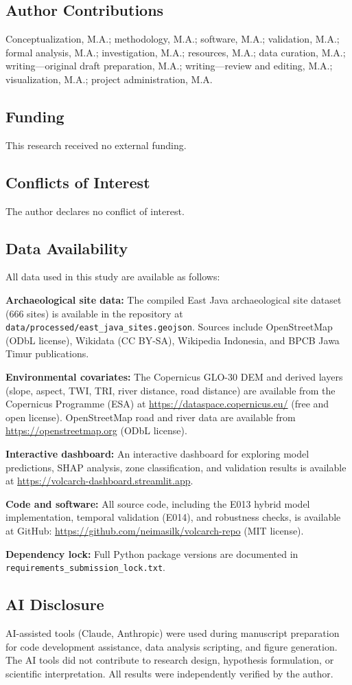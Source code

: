 \documentclass{article}
\begin{document}
\subsection*{Author Contributions}
Conceptualization, M.A.; methodology, M.A.; software, M.A.; validation, M.A.; formal analysis, M.A.; investigation, M.A.; resources, M.A.; data curation, M.A.; writing---original draft preparation, M.A.; writing---review and editing, M.A.; visualization, M.A.; project administration, M.A.

\subsection*{Funding}
This research received no external funding.

\subsection*{Conflicts of Interest}
The author declares no conflict of interest.

\subsection*{Data Availability}
All data used in this study are available as follows:

\textbf{Archaeological site data:} The compiled East Java archaeological site dataset (666 sites) is available in the repository at \texttt{data/processed/east\_java\_sites.geojson}. Sources include OpenStreetMap (ODbL license), Wikidata (CC BY-SA), Wikipedia Indonesia, and BPCB Jawa Timur publications.

\textbf{Environmental covariates:} The Copernicus GLO-30 DEM and derived layers (slope, aspect, TWI, TRI, river distance, road distance) are available from the Copernicus Programme (ESA) at \url{https://dataspace.copernicus.eu/} (free and open license). OpenStreetMap road and river data are available from \url{https://openstreetmap.org} (ODbL license).

\textbf{Interactive dashboard:} An interactive dashboard for exploring model predictions, SHAP analysis, zone classification, and validation results is available at \url{https://volcarch-dashboard.streamlit.app}.

\textbf{Code and software:} All source code, including the E013 hybrid model implementation, temporal validation (E014), and robustness checks, is available at GitHub: \url{https://github.com/neimasilk/volcarch-repo} (MIT license).

\textbf{Dependency lock:} Full Python package versions are documented in \texttt{requirements\_submission\_lock.txt}.

\subsection*{AI Disclosure}
AI-assisted tools (Claude, Anthropic) were used during manuscript preparation for code development assistance, data analysis scripting, and figure generation. The AI tools did not contribute to research design, hypothesis formulation, or scientific interpretation. All results were independently verified by the author.

\printbibliography
\end{document}
